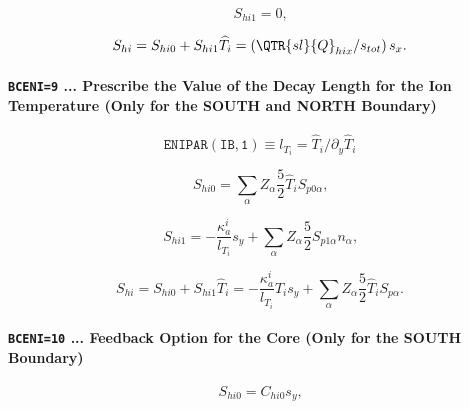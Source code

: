 \documentclass[11pt]{article}
\begin{document}
\begin{equation}
S_{hi1}=0\text{,}   \label{c288}
\end{equation}

\begin{equation}
S_{hi}=S_{hi0}+S_{hi1}\widehat{T}_{i}=\left( \QTR{sl}{Q}_{hix}/s_{tot}%
\right) s_{x}\text{.}   \label{c289}
\end{equation}

\bigskip

\paragraph{\texttt{BCENI=9} ... Prescribe the Value of the Decay Length for
the Ion Temperature (Only for the SOUTH and NORTH Boundary)}

\bigskip

\begin{equation*}
\mathtt{ENIPAR(IB,1)}\equiv l_{T_{i}}=\widehat{T}_{i}/\partial_{y}\widehat
{T}_{i}
\end{equation*}

\bigskip

\begin{equation}
S_{hi0}=\sum_{\alpha}Z_{\alpha}\frac{5}{2}\widehat{T}_{i}S_{p0\alpha}\text{,}
\label{c290}
\end{equation}

\begin{equation}
S_{hi1}=-\frac{\kappa_{a}^{i}}{l_{T_{i}}}s_{y}+\sum_{\alpha}Z_{\alpha}\frac
{5}{2}S_{p1\alpha}n_{\alpha}\text{,}   \label{c291}
\end{equation}

\begin{equation}
S_{hi}=S_{hi0}+S_{hi1}\widehat{T}_{i}=-\frac{\kappa_{a}^{i}}{l_{T_{i}}}%
\widehat{T}_{i}s_{y}+\sum_{\alpha}Z_{\alpha}\frac{5}{2}\widehat{T}%
_{i}S_{p\alpha}\text{.}   \label{c292}
\end{equation}

\bigskip

\paragraph{\texttt{BCENI=10} ... Feedback Option for the Core (Only for the
SOUTH Boundary)}

\bigskip

\begin{equation}
S_{hi0}=C_{hi0}s_{y}\text{,}   \label{c293}
\end{equation}
\end{document}

